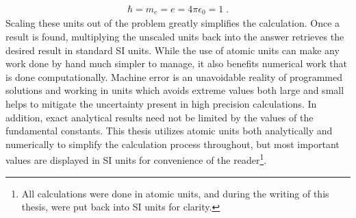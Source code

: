         \begin{align}
            \hbar = m_e = e = 4\pi \epsilon_0 = 1\;.
        \end{align}
        \noindent Scaling these units out of the problem greatly simplifies the calculation. Once a result is found, multiplying the unscaled units back into the answer retrieves the desired result in standard SI units. While the use of atomic units can make any work done by hand much simpler to manage, it also benefits numerical work that is done computationally. Machine error is an unavoidable reality of programmed solutions and working in units which avoids extreme values both large and small helps to mitigate the uncertainty present in high precision calculations. In addition, exact analytical results need not be limited by the values of the fundamental constants. This thesis utilizes atomic units both analytically and numerically to simplify the calculation process throughout, but most important values are displayed in SI units for convenience of the reader\footnote{All calculations were done in atomic units, and during the writing of this thesis, were put back into SI units for clarity.}.\\

